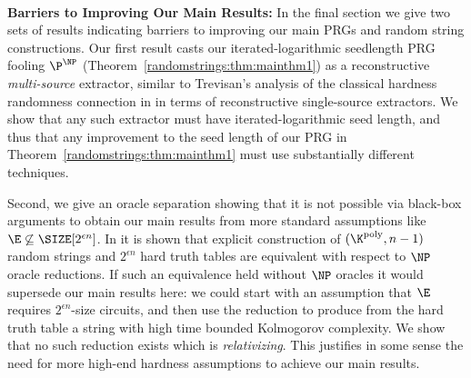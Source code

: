 

~\\
{\bf \noindent Barriers to Improving Our Main Results:} 
In the final section we give two sets of results indicating barriers to improving our main PRGs and random string constructions. Our first result casts our iterated-logarithmic seedlength PRG fooling $\P^{\NP}$ (Theorem~\ref{randomstrings:thm:mainthm1}) as a reconstructive \emph{multi-source} extractor, similar to Trevisan's analysis \cite{trevisan} of the classical hardness randomness connection in \cite{NW94,IW97} in terms of reconstructive single-source extractors. We show that any such extractor must have iterated-logarithmic seed length, and thus that any improvement to the seed length of our PRG in Theorem~\ref{randomstrings:thm:mainthm1} must use substantially different techniques.

Second, we give an oracle separation showing that it is not possible via black-box arguments to obtain our main results from more standard assumptions like $\E \not\subseteq \SIZE[2^{\epsilon n}]$. In \cite{Korten21} it is shown that explicit construction of $(\K^{\poly},n-1)$ random strings and $2^{\epsilon n}$ hard truth tables are equivalent with respect to $\NP$ oracle reductions. If such an equivalence held without $\NP$ oracles it would supersede our main results here: we could start with an assumption that $\E$ requires $2^{\epsilon n}$-size circuits, and then use the reduction to produce from the hard truth table a string with high time bounded Kolmogorov complexity. We show that no such reduction exists which is \emph{relativizing}. This justifies in some sense the need for more high-end hardness assumptions to achieve our main results. 

